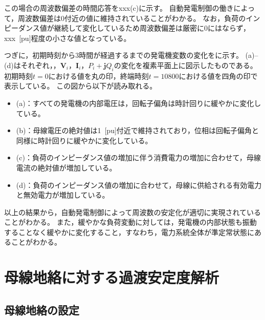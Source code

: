 \documentclass[tombow,dvipdfmx]{corona-a5-1.1}
\begin{document}
この場合の周波数偏差の時間応答をxxx(c)に示す。
自動発電制御の働きによって，周波数偏差は0付近の値に維持されていることがわかる。
なお，負荷のインピーダンス値が継続して変化しているため周波数偏差は厳密に0にはならず，xxx~[pu]程度の小さな値となっている。

つぎに，初期時刻から3時間が経過するまでの発電機変数の変化を\FIGref{}に示す。
\FIGref{}(a)--(d)はそれぞれ，，$\bm{V}_i$，$\bm{I}_i$，$P_i+\bm{j}Q_i$の変化を複素平面上に図示したものである。
初期時刻$t=0$における値を丸の印，終端時刻$t=10800$における値を四角の印で表示している。
この図から以下が読み取れる。

\begin{itemize}
\item \FIGref{}(a)：すべての発電機の内部電圧は，回転子偏角は時計回りに緩やかに変化している。
\item \FIGref{}(b)：母線電圧の絶対値は1~[pu]付近で維持されており，位相は回転子偏角と同様に時計回りに緩やかに変化している。
\item \FIGref{}(c)：負荷のインピーダンス値の増加に伴う消費電力の増加に合わせて，母線電流の絶対値が増加している。
\item \FIGref{}(d)：負荷のインピーダンス値の増加に合わせて，母線に供給される有効電力と無効電力が増加している。
\end{itemize}

以上の結果から，自動発電制御によって周波数の安定化が適切に実現されていることがわかる。
また，緩やかな負荷変動に対しては，発電機の内部状態も振動することなく緩やかに変化すること，すなわち，電力系統全体が準定常状態にあることがわかる。

\section{母線地絡に対する過渡安定度解析}

\subsection{母線地絡の設定}
\end{document}
